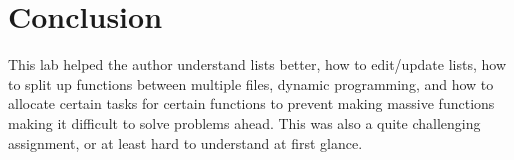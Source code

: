 \documentclass[a4paper,11pt]{article}
\begin{document}
\section*{Conclusion}

This lab helped the author understand lists better, how to edit/update lists, how to split up functions between multiple files, dynamic programming, and how to allocate certain tasks for certain functions to prevent making massive functions making it difficult to solve problems ahead. This was also a quite challenging assignment, or at least hard to understand at first glance.
\end{document}
